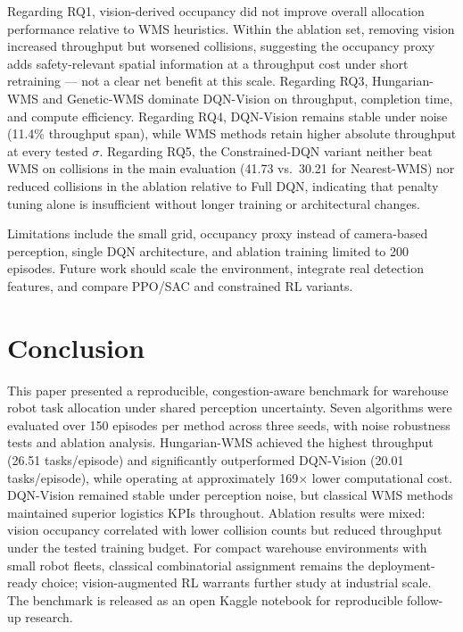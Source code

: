 \documentclass[conference]{IEEEtran}
\begin{document}
Regarding RQ1, vision-derived occupancy did not improve overall allocation performance relative to WMS heuristics.
Within the ablation set, removing vision increased throughput but worsened collisions, suggesting the occupancy proxy adds safety-relevant spatial information at a throughput cost under short retraining --- not a clear net benefit at this scale.
Regarding RQ3, Hungarian-WMS and Genetic-WMS dominate DQN-Vision on throughput, completion time, and compute efficiency.
Regarding RQ4, DQN-Vision remains stable under noise (11.4\% throughput span), while WMS methods retain higher absolute throughput at every tested $\sigma$.
Regarding RQ5, the Constrained-DQN variant neither beat WMS on collisions in the main evaluation (41.73 vs.\ 30.21 for Nearest-WMS) nor reduced collisions in the ablation relative to Full DQN, indicating that penalty tuning alone is insufficient without longer training or architectural changes.

Limitations include the small grid, occupancy proxy instead of camera-based perception, single DQN architecture, and ablation training limited to 200 episodes.
Future work should scale the environment, integrate real detection features, and compare PPO/SAC and constrained RL variants.


\section{Conclusion}

This paper presented a reproducible, congestion-aware benchmark for warehouse robot task allocation under shared perception uncertainty.
Seven algorithms were evaluated over 150 episodes per method across three seeds, with noise robustness tests and ablation analysis.
Hungarian-WMS achieved the highest throughput (26.51 tasks/episode) and significantly outperformed DQN-Vision (20.01 tasks/episode), while operating at approximately 169$\times$ lower computational cost.
DQN-Vision remained stable under perception noise, but classical WMS methods maintained superior logistics KPIs throughout.
Ablation results were mixed: vision occupancy correlated with lower collision counts but reduced throughput under the tested training budget.
For compact warehouse environments with small robot fleets, classical combinatorial assignment remains the deployment-ready choice; vision-augmented RL warrants further study at industrial scale.
The benchmark is released as an open Kaggle notebook for reproducible follow-up research.




\end{document}
